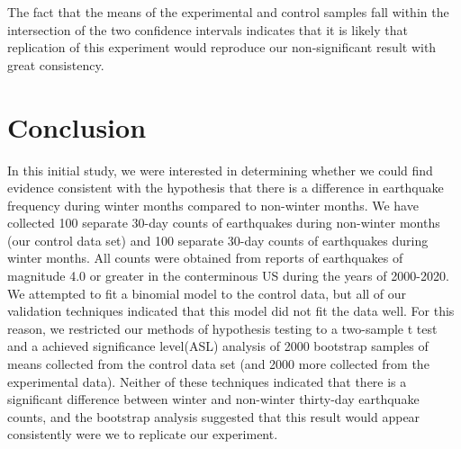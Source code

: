 \documentclass{amsart}
\begin{document}
The fact that the means of the experimental and control samples fall within the intersection of the two confidence intervals indicates that it is likely that replication of this experiment would reproduce our non-significant result with great consistency.
\section{Conclusion}
In this initial study, we were interested in determining whether we could find evidence consistent with the hypothesis that there is a difference in earthquake frequency during winter months compared to non-winter months. We have collected 
100 separate 30-day counts of earthquakes during non-winter months (our control data set) and 100 separate 30-day counts of earthquakes during winter months. All counts were obtained from reports of earthquakes of magnitude 4.0 or greater in the conterminous US during the years of 2000-2020. We attempted to fit a binomial model to the control data, but all of our validation techniques indicated that this model did not fit the data well. For this reason, we restricted our methods of hypothesis testing to a two-sample t test and a achieved significance level(ASL) analysis of 2000 bootstrap samples of means collected from the control data set (and 2000 more collected from the experimental data). Neither of these techniques indicated that there is a significant difference between winter and non-winter thirty-day earthquake counts, and the bootstrap analysis suggested that this result would appear consistently were we to replicate our experiment.
\end{document}
